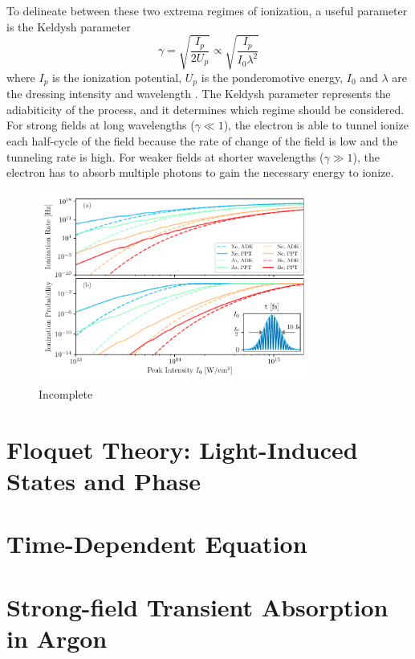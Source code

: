 To delineate between these two extrema regimes of ionization, a useful parameter is the Keldysh parameter
\begin{equation}
	\label{eqn:keldysh_param}
	\gamma=\sqrt{\frac{I_p}{2 U_p}}\propto\sqrt{\frac{I_p}{I_0 \lambda^2}}
\end{equation}
where $I_p$ is the ionization potential, $U_p$ is the ponderomotive energy, $I_0$ and $\lambda$ are the dressing intensity and wavelength \cite{keldyshIonizationFieldStrong1965}.  The Keldysh parameter represents the adiabiticity of the process, and it determines which regime should be considered.  For strong fields at long wavelengths ($\gamma \ll 1$), the electron is able to tunnel ionize each half-cycle of the field because the rate of change of the field is low and the tunneling rate is high.  For weaker fields at shorter wavelengths ($\gamma \gg 1$), the electron has to absorb multiple photons to gain the necessary energy to ionize.


\begin{figure}
	\centering
	\includegraphics[width=0.8\textwidth]{figures/ATS/ADK_PPT.pdf}
	\caption[ADK and PPT ionization of noble gases]{Incomplete}
	\label{fig:adk_ppt}
\end{figure}

\section{Floquet Theory: Light-Induced States and Phase}
\label{sec:LIS_Floquet}


\section{Time-Dependent \Schrodinger Equation}
\label{sec:Full_TDSE}

\section{Strong-field Transient Absorption in Argon}
\label{sec:ATS_ar}

